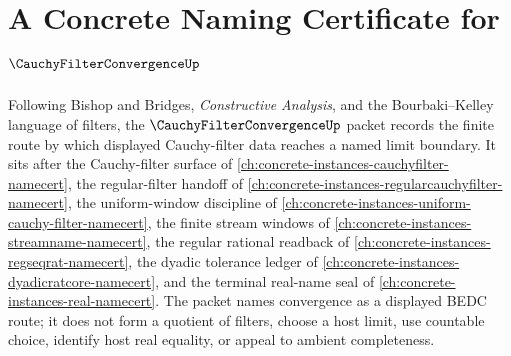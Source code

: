 \chapter{A Concrete Naming Certificate for $\CauchyFilterConvergenceUp$}
\label{ch:concrete-instances-cauchy-filter-convergence-namecert}

Following Bishop and Bridges, \emph{Constructive Analysis}, and the Bourbaki--Kelley language of filters, the $\CauchyFilterConvergenceUp$ packet records the finite route by which displayed Cauchy-filter data reaches a named limit boundary. It sits after the Cauchy-filter surface of \autoref{ch:concrete-instances-cauchyfilter-namecert}, the regular-filter handoff of \autoref{ch:concrete-instances-regularcauchyfilter-namecert}, the uniform-window discipline of \autoref{ch:concrete-instances-uniform-cauchy-filter-namecert}, the finite stream windows of \autoref{ch:concrete-instances-streamname-namecert}, the regular rational readback of \autoref{ch:concrete-instances-regseqrat-namecert}, the dyadic tolerance ledger of \autoref{ch:concrete-instances-dyadicratcore-namecert}, and the terminal real-name seal of \autoref{ch:concrete-instances-real-namecert}. The packet names convergence as a displayed BEDC route; it does not form a quotient of filters, choose a host limit, use countable choice, identify host real equality, or appeal to ambient completeness.

